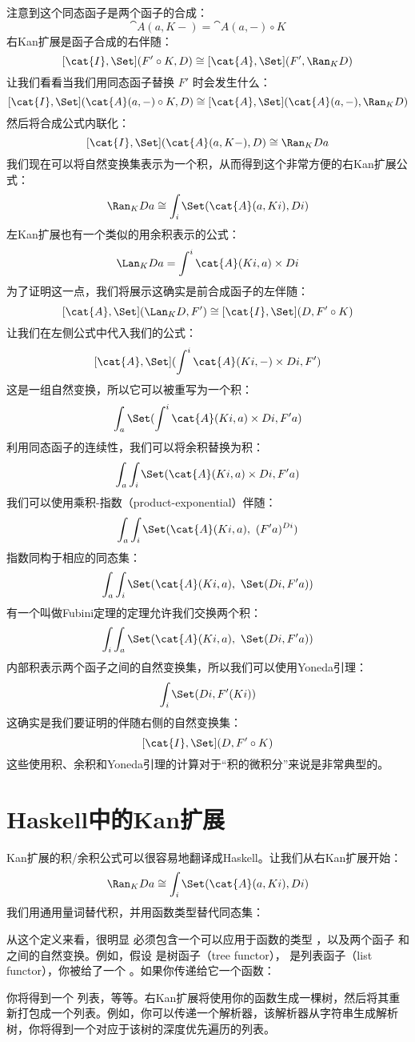 \noindent
注意到这个同态函子是两个函子的合成：
\[\cat{A}(a, K -) = \cat{A}(a, -) \circ K\]
右Kan扩展是函子合成的右伴随：
\[[\cat{I}, \Set](F' \circ K, D) \cong [\cat{A}, \Set](F', \Ran_{K}D)\]
让我们看看当我们用同态函子替换 $F'$ 时会发生什么：
\[[\cat{I}, \Set](\cat{A}(a, -) \circ K, D) \cong [\cat{A}, \Set](\cat{A}(a, -), \Ran_{K}D)\]
然后将合成公式内联化：
\[[\cat{I}, \Set](\cat{A}(a, K -), D) \cong \Ran_{K}D a\]
我们现在可以将自然变换集表示为一个积，从而得到这个非常方便的右Kan扩展公式：
\[\Ran_{K}D a \cong \int_i \Set(\cat{A}(a, K i), D i)\]
左Kan扩展也有一个类似的用余积表示的公式：
\[\Lan_{K}D a = \int^i \cat{A}(K i, a)\times{}D i\]
为了证明这一点，我们将展示这确实是前合成函子的左伴随：
\[[\cat{A}, \Set](\Lan_{K}D, F') \cong [\cat{I}, \Set](D, F' \circ K)\]
让我们在左侧公式中代入我们的公式：
\[[\cat{A}, \Set](\int^i \cat{A}(K i, -)\times{}D i, F')\]
这是一组自然变换，所以它可以被重写为一个积：
\[\int_a \Set(\int^i \cat{A}(K i, a)\times{}D i, F' a)\]
利用同态函子的连续性，我们可以将余积替换为积：
\[\int_a \int_i \Set(\cat{A}(K i, a)\times{}D i, F' a)\]
我们可以使用乘积-指数（product-exponential）伴随：
\[\int_a \int_i \Set(\cat{A}(K i, a),\ (F' a)^{D i})\]
指数同构于相应的同态集：
\[\int_a \int_i \Set(\cat{A}(K i, a),\ \Set(D i, F' a))\]
有一个叫做Fubini定理的定理允许我们交换两个积：
\[\int_i \int_a \Set(\cat{A}(K i, a),\ \Set(D i, F' a))\]
内部积表示两个函子之间的自然变换集，所以我们可以使用Yoneda引理：
\[\int_i \Set(D i, F' (K i))\]
这确实是我们要证明的伴随右侧的自然变换集：
\[[\cat{I}, \Set](D, F' \circ K)\]
这些使用积、余积和Yoneda引理的计算对于“积的微积分”来说是非常典型的。

\section{Haskell中的Kan扩展}

Kan扩展的积/余积公式可以很容易地翻译成Haskell。让我们从右Kan扩展开始：
\[\Ran_{K}D a \cong \int_i \Set(\cat{A}(a, K i), D i)\]
我们用通用量词替代积，并用函数类型替代同态集：

从这个定义来看，很明显  必须包含一个可以应用于函数的类型 ，以及两个函子  和  之间的自然变换。例如，假设  是树函子（tree functor）， 是列表函子（list functor），你被给了一个 。如果你传递给它一个函数：

你将得到一个  列表，等等。右Kan扩展将使用你的函数生成一棵树，然后将其重新打包成一个列表。例如，你可以传递一个解析器，该解析器从字符串生成解析树，你将得到一个对应于该树的深度优先遍历的列表。

